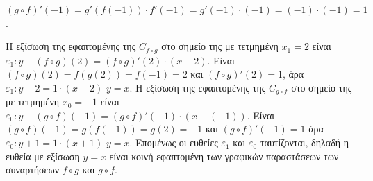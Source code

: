 \begin{alist}
\begin{rlist}
$(g \circ f)'(-1) = g'(f(-1)) \cdot f'(-1) = g'(-1) \cdot (-1) = (-1) \cdot (-1) = 1$.
\end{rlist}
\item [$\boldsymbol{\gamma}$)]
Η εξίσωση της εφαπτομένης της $C_{f \circ g}$ στο σημείο της με τετμημένη $x_1=2$ είναι
$\varepsilon_1: y - (f \circ g)(2) = (f \circ g)'(2) \cdot (x-2)$.
Είναι
$(f \circ g)(2) = f(g(2)) = f(-1) = 2$ και $(f \circ g)'(2) = 1$,
άρα
$\varepsilon_1: y-2=1 \cdot (x-2)$
$y=x$.
Η εξίσωση της εφαπτομένης της $C_{g \circ f}$ στο σημείο της με τετμημένη $x_0=-1$ είναι
$\varepsilon_0: y - (g \circ f)(-1) = (g \circ f)'(-1) \cdot (x-(-1))$.
Είναι
$(g \circ f)(-1) = g(f(-1)) = g(2) = -1$ και $(g \circ f)'(-1) = 1$
άρα
$\varepsilon_0: y+1=1 \cdot (x+1)$
$y=x$.
Επομένως οι ευθείες $\varepsilon_1$ και $\varepsilon_0$ ταυτίζονται, δηλαδή η ευθεία με εξίσωση $y=x$ είναι κοινή εφαπτομένη των γραφικών παραστάσεων των συναρτήσεων $f \circ g$ και $g \circ f$.
\end{alist}